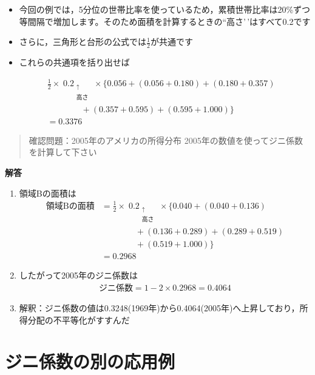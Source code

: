 \documentclass[
]{book}
\theoremstyle{definition}
\theoremstyle{definition}
\theoremstyle{definition}
\theoremstyle{definition}
\theoremstyle{remark}
\begin{document}
\begin{itemize}
\item
  今回の例では，5分位の世帯比率を使っているため，累積世帯比率は20\%ずつ等間隔で増加します。そのため面積を計算するときの``高さ'\,'はすべて0.2です
\item
  さらに，三角形と台形の公式では\(\tfrac{1}{2}\)が共通です
\item
  これらの共通項を括り出せば
\end{itemize}

\begin{align*} 
&\tfrac{1}{2} \times \mathop{0.2}_{\substack{\uparrow \\ \text{高さ}}} \times 
\{ 0.056+ (0.056+0.180)+ (0.180+0.357) \\
&\qquad\qquad+(0.357+0.595)+(0.595+1.000) \} \\
&=0.3376
\end{align*}

\begin{quote}
確認問題：2005年のアメリカの所得分布
2005年の数値を使ってジニ係数を計算して下さい
\end{quote}

\textbf{解答}

\begin{enumerate}
\def\labelenumi{\arabic{enumi}.}
\item
  領域Bの面積は
  \begin{align*}
  \text{領域Bの面積}
  &=\tfrac{1}{2} \times \mathop{0.2}_{\substack{\uparrow \\ \text{高さ}}} \times 
  \{ 0.040+ (0.040+0.136) \\
  &\qquad\qquad+(0.136+0.289)+(0.289+0.519) \\
  &\qquad\qquad+(0.519+1.000) \} \\
  &=0.2968
  \end{align*}
\item
  したがって2005年のジニ係数は
  \begin{align*}
  \text{ジニ係数}
  =1-2 \times 0.2968
  =0.4064
  \end{align*}
\item
  解釈：ジニ係数の値は0.3248(1969年)から0.4064(2005年)へ上昇しており，所得分配の不平等化がすすんだ
\end{enumerate}

\hypertarget{ux30b8ux30cbux4fc2ux6570ux306eux5225ux306eux5fdcux7528ux4f8b}{%
\chapter{ジニ係数の別の応用例}\label{ux30b8ux30cbux4fc2ux6570ux306eux5225ux306eux5fdcux7528ux4f8b}}
\end{document}
